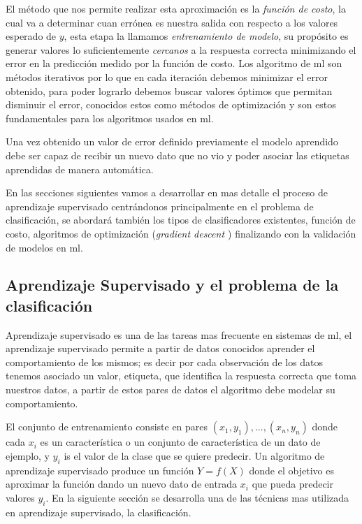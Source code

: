 El método que nos permite realizar esta aproximación es la \textit{función de costo}, la cual va a  determinar cuan errónea es nuestra salida con respecto a los valores esperado de  $ y$, esta etapa la llamamos \textit{entrenamiento de modelo}, su propósito es generar valores lo suficientemente \textit{cercanos} a la respuesta correcta minimizando el error en la predicción medido por la función de costo. Los algoritmo de \ac{ml} son métodos iterativos por lo que en cada iteración debemos minimizar el error obtenido, para poder lograrlo debemos buscar valores óptimos que permitan disminuir el error, conocidos estos como {métodos de optimización}  y son estos fundamentales  para los algoritmos usados en \ac{ml}.

  Una vez obtenido un valor de error definido previamente el modelo aprendido debe ser capaz de recibir un nuevo dato que no vio y poder asociar las etiquetas aprendidas de manera automática.

En las secciones siguientes vamos a desarrollar en mas  detalle el proceso de aprendizaje supervisado centrándonos principalmente en el problema de clasificación, se abordará también los tipos de clasificadores existentes, función de costo,  algoritmos de optimización (\textit{gradient descent \citep{cnns}}) finalizando con la validación de modelos en \ac{ml}.

\subsection{Aprendizaje Supervisado y el problema de la clasificación}\label{sub:aprendizaje_supervisado}

Aprendizaje supervisado es una de las tareas mas frecuente en sistemas de \ac{ml}, el aprendizaje supervisado permite a partir de datos conocidos aprender el comportamiento de los mismos; es decir por cada observación de los datos tenemos asociado un valor, etiqueta, que identifica la respuesta correcta que toma nuestros datos, a partir de estos pares de datos el algoritmo debe modelar su comportamiento. 

El conjunto de entrenamiento consiste en pares $(x_1, y_1), ...,(x_n, y_n)$ donde cada $x_i$  es un característica o un conjunto de característica de un dato de ejemplo, y $y_i$ is el valor de la clase que se quiere predecir. Un algoritmo de aprendizaje supervisado produce un función $Y = f(X)$ donde el objetivo es aproximar la función dando un nuevo dato de entrada $x_i$ que pueda predecir valores $y_i$. En la siguiente sección se desarrolla una de las técnicas mas utilizada en aprendizaje supervisado, la clasificación.

